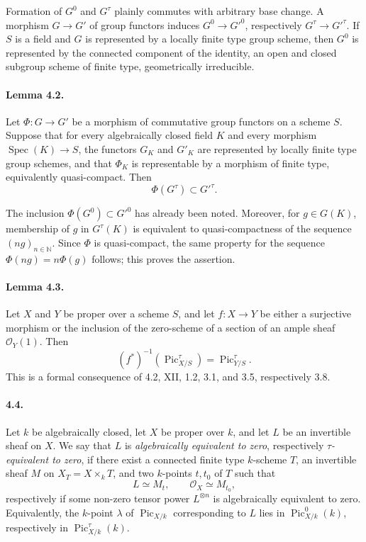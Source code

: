 \documentclass[12pt]{article}
\newcommand{\NN}{\mathbb N}
\newcommand{\cO}{\mathcal O}
\newcommand{\Pic}{\operatorname{Pic}}
\newcommand{\Spec}{\operatorname{Spec}}
\begin{document}
Formation of $G^0$ and $G^\tau$ plainly commutes with arbitrary base change. A morphism $G\to G'$ of group functors induces $G^0\to G'^0$, respectively $G^\tau\to G'^\tau$. If $S$ is a field and $G$ is represented by a locally finite type group scheme, then $G^0$ is represented by the connected component of the identity, an open and closed subgroup scheme of finite type, geometrically irreducible.

\paragraph{Lemma 4.2.}
Let $\Phi:G\to G'$ be a morphism of commutative group functors on a scheme $S$. Suppose that for every algebraically closed field $K$ and every morphism $\Spec(K)\to S$, the functors $G_K$ and $G'_K$ are represented by locally finite type group schemes, and that $\Phi_K$ is representable by a morphism of finite type, equivalently quasi-compact. Then
\[
\Phi(G^\tau)\subset G'^\tau.
\]

The inclusion $\Phi(G^0)\subset G'^0$ has already been noted. Moreover, for $g\in G(K)$, membership of $g$ in $G^\tau(K)$ is equivalent to quasi-compactness of the sequence $(ng)_{n\in\NN}$. Since $\Phi$ is quasi-compact, the same property for the sequence $\Phi(ng)=n\Phi(g)$ follows; this proves the assertion.

\paragraph{Lemma 4.3.}
Let $X$ and $Y$ be proper over a scheme $S$, and let $f:X\to Y$ be either a surjective morphism or the inclusion of the zero-scheme of a section of an ample sheaf $\cO_Y(1)$. Then
\[
(f^*)^{-1}(\Pic^\tau_{X/S})=\Pic^\tau_{Y/S}.
\]
This is a formal consequence of 4.2, XII, 1.2, 3.1, and 3.5, respectively 3.8.

\paragraph{4.4.}
Let $k$ be algebraically closed, let $X$ be proper over $k$, and let $L$ be an invertible sheaf on $X$. We say that $L$ is \emph{algebraically equivalent to zero}, respectively \emph{$\tau$-equivalent to zero}, if there exist a connected finite type $k$-scheme $T$, an invertible sheaf $M$ on $X_T=X\times_kT$, and two $k$-points $t,t_0$ of $T$ such that
\[
L\simeq M_t,\qquad \cO_X\simeq M_{t_0},
\]
respectively if some non-zero tensor power $L^{\otimes n}$ is algebraically equivalent to zero. Equivalently, the $k$-point $\lambda$ of $\Pic_{X/k}$ corresponding to $L$ lies in $\Pic^0_{X/k}(k)$, respectively in $\Pic^\tau_{X/k}(k)$.
\end{document}
